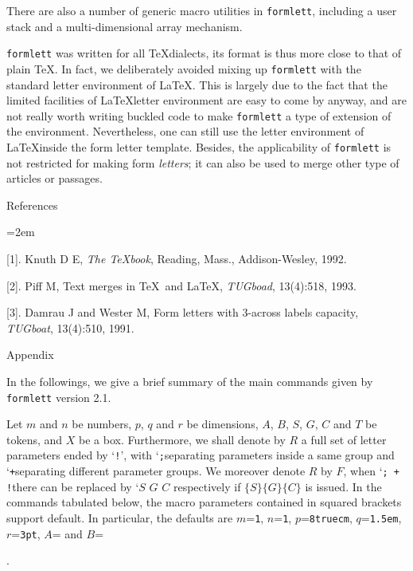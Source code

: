 {\medskip

There are also a number of generic macro utilities in {\tt formlett},
including a user stack and a multi-dimensional array mechanism.

\medskip

{\tt formlett} was written for all \TeX\space dialects, its format is
thus more close to that of plain \TeX. In fact, we deliberately avoided
mixing up {\tt formlett} with the standard letter environment of \LaTeX.
This is largely due to the fact that the limited facilities of
\LaTeX\space letter environment are easy to come by anyway, and are not
really worth writing buckled code to make {\tt formlett} a type of
extension of the environment. Nevertheless, one can still use the letter
environment of \LaTeX\space inside the form letter template. Besides,
the applicability of {\tt formlett} is not restricted for making form
{\sl letters}; it can also be used to merge other type of articles or
passages.




\bigskip
{\lbold References}

\smallskip
{\parindent=2em
\item{[1].} Knuth D E, {\sl The \TeX book}, Reading, Mass.,
Addison-Wesley, 1992. \par
\item{[2].} Piff M, Text merges in \TeX\ and \LaTeX, {\sl TUGboad},
13(4):518, 1993. \par
\item{[3].} Damrau J and Wester M, Form letters with 3-across
labels capacity, {\sl TUGboat}, 13(4):510, 1991.
\par
}




\bigskip

{\lbold Appendix}



\smallskip


In the followings, we give a brief summary of the main commands given by
{\tt formlett} version 2.1.

\medskip

Let $m$ and $n$ be numbers, $p$, $q$ and $r$ be dimensions, $A$,
$B$, $S$, $G$, $C$ and $T$ be tokens, and $X$ be a box.
Furthermore, we shall denote by $R$ a full set of letter
parameters ended by \lq{\tt !}\rq, with \lq{\tt;}\rqs separating
parameters inside a same group and \lq{\tt+}\rqs separating
different parameter groups. We moreover denote $R$ by $F$, when
\lq{\tt ; + !}\rqs there can be replaced by \lq$S$ $G$ $C$\rqs
respectively if {\tt \string\delimiters$\{S\}\{G\}\{C\}$} is
issued. In the commands tabulated below, the macro parameters
contained in squared brackets support default. In particular, the
defaults are $m$={\tt 1}, $n$={\tt 1}, $p$={\tt 8truecm},
$q$={\tt 1.5em}, $r$={\tt 3pt}, $A$={\tt\string\noindent} and
$B$={\tt\string\par}.



}
